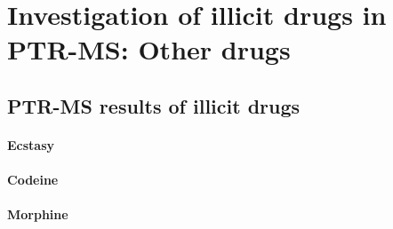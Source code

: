 \chapter{Investigation of illicit drugs in PTR-MS: Other drugs}

\section{PTR-MS results of illicit drugs}




\subsubsection{Ecstasy}




\subsubsection{Codeine}




\subsubsection{Morphine}




